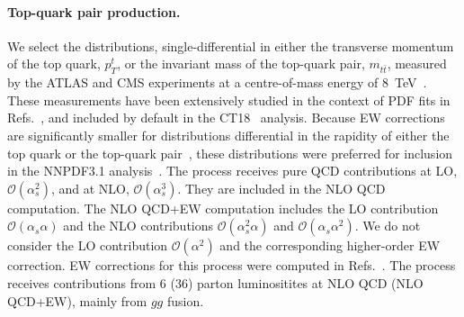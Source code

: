 \paragraph{Top-quark pair production.}
We select the distributions, single-differential in either the transverse
momentum of the top quark, $p_T^t$, or the invariant mass of the top-quark
pair, $m_{t\bar t}$, measured by the ATLAS and CMS experiments at a centre-of-mass
energy of 8~TeV~\cite{Aad:2015mbv,Khachatryan:2015oqa}. These measurements have
been extensively studied in the context of PDF fits in
Refs.~\cite{Czakon:2016olj,Bailey:2019yze,Amoroso:2020lgh,Kadir:2020yml}, and
included by default in the CT18~\cite{Hou:2019efy} analysis.
Because EW corrections are significantly smaller for distributions differential
in the rapidity of either the top quark or the top-quark
pair~\cite{Czakon:2017wor}, these distributions were preferred for inclusion
in the NNPDF3.1 analysis~\cite{Ball:2017nwa}. The process receives
pure QCD contributions at LO, $\mathcal{O}(\alpha_s^2)$, and
at NLO, $\mathcal{O}(\alpha_s^3)$. They are included in the NLO QCD
computation. The NLO QCD+EW computation includes the LO contribution
$\mathcal{O}(\alpha_s\alpha)$ and the NLO contributions
$\mathcal{O}(\alpha_s^2\alpha)$ and $\mathcal{O}(\alpha_s\alpha^2)$.
We do not consider the LO contribution $\mathcal{O}(\alpha^2)$ and the
corresponding higher-order EW correction. EW corrections for this process
were computed in Refs.~\cite{Bernreuther:2010ny,Hollik:2011ps,Kuhn:2011ri,Bernreuther:2012sx,Pagani:2016caq,Czakon:2017wor,Czakon:2017lgo,Czakon:2017mmr,Czakon:2019bcq,Czakon:2019txp}. The process receives contributions from
6 (36) parton luminositites at NLO QCD (NLO QCD+EW), mainly from $gg$ fusion.

